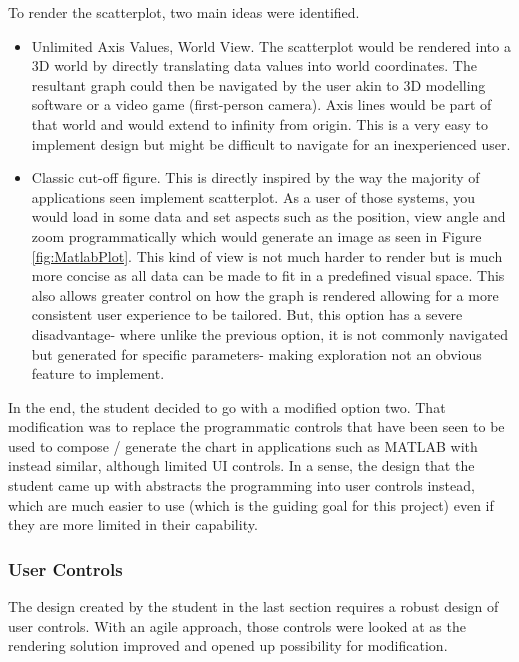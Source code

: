 To render the scatterplot, two main ideas were identified.
\begin{itemize}
    \item Unlimited Axis Values, World View. The scatterplot would be rendered into a 3D world by directly translating data values into world coordinates. The resultant graph could then be navigated by the user akin to 3D modelling software or a video game (first-person camera). Axis lines would be part of that world and would extend to infinity from origin. This is a very easy to implement design but might be difficult to navigate for an inexperienced user.
    \item Classic cut-off figure. This is directly inspired by the way the majority of applications seen implement scatterplot. As a user of those systems, you would load in some data and set aspects such as the position, view angle and zoom programmatically which would generate an  image as seen in Figure \ref*{fig:MatlabPlot}. This kind of view is not much harder to render but is much more concise as all data can be made to fit in a predefined visual space. This also allows greater control on how the graph is rendered allowing for a more consistent user experience to be tailored. But, this option has a severe disadvantage- where unlike the previous option, it is not commonly navigated but generated for specific parameters- making exploration not an obvious feature to implement.
\end{itemize}

In the end, the student decided to go with a modified option two. That modification was to replace the programmatic controls that have been seen to be used to compose / generate the chart in applications such as MATLAB with instead similar, although limited UI controls. In a sense, the design that the student came up with abstracts the programming into user controls instead, which are much easier to use (which is the guiding goal for this project) even if they are more limited in their capability.

\subsubsection{User Controls}
The design created by the student in the last section requires a robust design of user controls. With an agile approach, those controls were looked at as the rendering solution improved and opened up possibility for modification.

